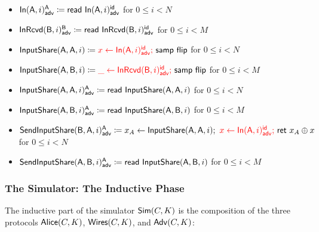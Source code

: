 \begin{itemize}
\item {\color{red} $\LeakIn(\A,i)^\A_\adv \coloneqq \read{\LeakIn(\A,i)^\id_\adv}$ for $0 \leq i < N$}
\item {\color{red} $\LeakInRcvd(\B,i)^\B_\adv \coloneqq \read{\LeakInRcvd(\B,i)^\id_\adv}$ for $0 \leq i < M$}\smallskip
\item $\InputShare(\A,\A,i) \coloneqq {\color{red} x \leftarrow \LeakIn(\A,i)^\id_\adv; \ } \samp{\flip}$ for $0 \leq i < N$
\item $\InputShare(\A,\B,i) \coloneqq {\color{red} \_ \leftarrow \LeakInRcvd(\B,i)^\id_\adv; \ } \samp{\flip}$ for $0 \leq i < M$\smallskip
\item {\color{blue} $\LeakInputShare(\A,\A,i)^\A_\adv \coloneqq \read{\InputShare(\A,\A,i)}$ for $0 \leq i < N$}
\item {\color{blue} $\LeakInputShare(\A,\B,i)^\A_\adv \coloneqq \read{\InputShare(\A,\B,i)}$ for $0 \leq i < M$}\smallskip
\item {\color{blue} $\LeakSendInputShare(\B,\A,i)^\A_\adv \coloneqq x_A \leftarrow \InputShare(\A,\A,i); \ {\color{red} x \leftarrow \LeakIn(\A,i)^\id_\adv; \ } \ret{x_A \oplus x}$ for $0 \leq i < N$}
\item {\color{blue} $\LeakSendInputShare(\A,\B,i)^\A_\adv \coloneqq \read{\InputShare(\A,\B,i)}$ for $0 \leq i < M$}
\end{itemize}

\subsubsection{The Simulator: The Inductive Phase}
The inductive part of the simulator $\Sim(C,K)$ is the composition of the three protocols $\Alice(C,K)$, $\Wires(C,K)$, and $\Adv(C,K)$:

